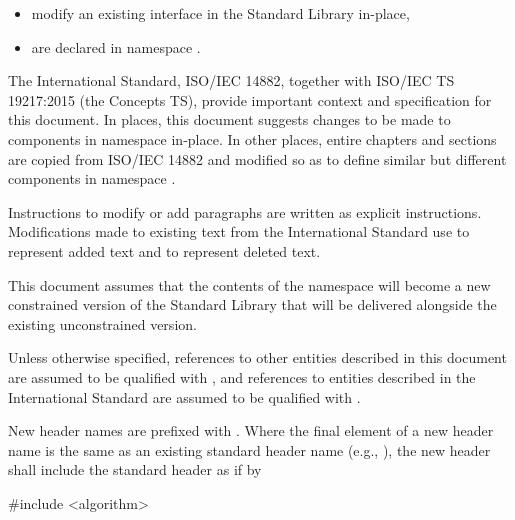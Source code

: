 \begin{itemize}
\item modify an existing interface in the \Cpp Standard Library in-place,
\item are declared in namespace .
\end{itemize}

\pnum
The International Standard, ISO/IEC 14882, together with ISO/IEC TS 19217:2015 (the Concepts TS),
provide important context and specification for this document. In places, this document suggests
changes to be made to components in namespace  in-place. In
other places, entire chapters and sections are copied from ISO/IEC 14882 and modified so as to
define similar but different components in namespace .

\pnum
Instructions to modify or add paragraphs are written as explicit instructions.
Modifications made to existing text from the International Standard use
 to represent added text and  to
represent deleted text.

\pnum
This document assumes that the contents of the 
namespace will become a new constrained version of the \Cpp Standard Library
that will be delivered alongside the existing unconstrained version.

\pnum
Unless otherwise specified, references to other entities described in this
document are assumed to be qualified with , and
references to entities described in the International Standard are assumed to be
qualified with .

\pnum
New header names are prefixed with . Where
the final element of a new header name is the same as an existing standard header
name (e.g., ), the new header shall include
the standard header as if by

\begin{codeblock}
#include <algorithm>
\end{codeblock}
